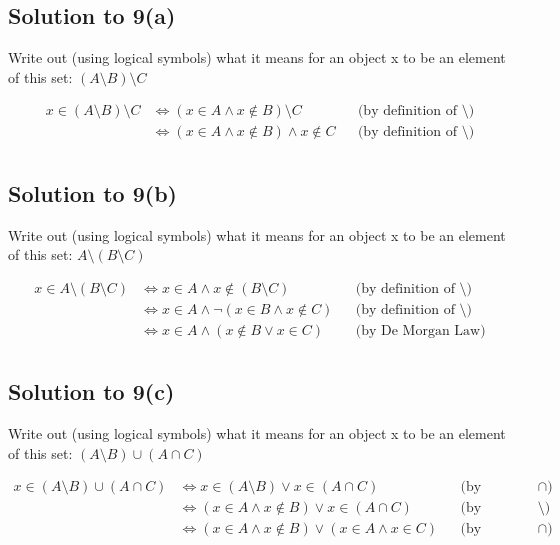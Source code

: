 \documentclass{scrartcl}
\begin{document}
    \subsection*{Solution to 9(a)}
        Write out (using logical symbols) what it means for an object x to be an element of this set: $(A \setminus B) \setminus C$

        \begin{align*}
            x \in (A \setminus B) \setminus C
            &\Leftrightarrow (x \in A \wedge x \notin B) \setminus C
            && \text{(by definition of $\setminus$)} \\
            &\Leftrightarrow (x \in A \wedge x \notin B) \wedge x \notin C
            && \text{(by definition of $\setminus$)} \\
        \end{align*}

    \subsection*{Solution to 9(b)}
        Write out (using logical symbols) what it means for an object x to be an element of this set: $A \setminus (B \setminus C)$

        \begin{align*}
            x \in A \setminus (B \setminus C)
            &\Leftrightarrow x \in A \wedge x \notin (B \setminus C)
            && \text{(by definition of $\setminus$)} \\
            &\Leftrightarrow x \in A \wedge \neg (x \in B \wedge x \notin C)
            && \text{(by definition of $\setminus$)} \\
            &\Leftrightarrow x \in A \wedge (x \notin B \vee x \in C)
            && \text{(by De Morgan Law)} \\
        \end{align*}

    \subsection*{Solution to 9(c)}
        Write out (using logical symbols) what it means for an object x to be an element of this set: $(A \setminus B) \cup (A \cap C)$

        \begin{align*}
            x \in (A \setminus B) \cup (A \cap C)
            &\Leftrightarrow x \in (A \setminus B) \vee x \in (A \cap C)
            && \text{(by definition of $\cap$)} \\
            &\Leftrightarrow (x \in A \wedge x \notin B) \vee x \in (A \cap C)
            && \text{(by definition of $\setminus$)} \\
            &\Leftrightarrow (x \in A \wedge x \notin B) \vee (x \in A \wedge x \in C)
            && \text{(by definition of $\cap$)} \\
        \end{align*}
\end{document}
